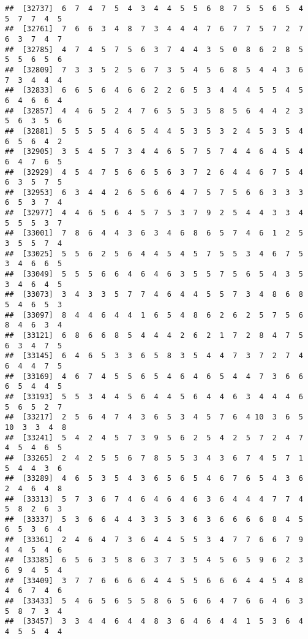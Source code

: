 \documentclass[
]{book}
\begin{document}
\begin{verbatim}
##  [32737]  6  7  4  7  5  4  3  4  4  5  5  6  8  7  5  5  6  5  4  5  7  7  4  5
##  [32761]  7  6  6  3  4  8  7  3  4  4  4  7  6  7  7  5  7  2  7  6  3  7  4  7
##  [32785]  4  7  4  5  7  5  6  3  7  4  4  3  5  0  8  6  2  8  5  5  5  6  5  6
##  [32809]  7  3  3  5  2  5  6  7  3  5  4  5  6  8  5  4  4  3  6  7  3  4  4  4
##  [32833]  6  6  5  6  4  6  6  2  2  6  5  3  4  4  4  5  5  4  5  6  4  6  6  4
##  [32857]  4  4  6  5  2  4  7  6  5  5  3  5  8  5  6  4  4  2  3  5  6  3  5  6
##  [32881]  5  5  5  5  4  6  5  4  4  5  3  5  3  2  4  5  3  5  4  6  5  6  4  2
##  [32905]  3  5  4  5  7  3  4  4  6  5  7  5  7  4  4  6  4  5  4  6  4  7  6  5
##  [32929]  4  5  4  7  5  6  6  5  6  3  7  2  6  4  4  6  7  5  4  6  3  5  7  5
##  [32953]  6  3  4  4  2  6  5  6  6  4  7  5  7  5  6  6  3  3  3  6  5  3  7  4
##  [32977]  4  4  6  5  6  4  5  7  5  3  7  9  2  5  4  4  3  3  4  5  5  5  3  7
##  [33001]  7  8  6  4  4  3  6  3  4  6  8  6  5  7  4  6  1  2  5  3  5  5  7  4
##  [33025]  5  5  6  2  5  6  4  4  5  4  5  7  5  5  3  4  6  7  5  3  4  6  6  5
##  [33049]  5  5  5  6  6  4  6  4  6  3  5  5  7  5  6  5  4  3  5  3  4  6  4  5
##  [33073]  3  4  3  3  5  7  7  4  6  4  4  5  5  7  3  4  8  6  8  5  4  6  5  3
##  [33097]  8  4  4  6  4  4  1  6  5  4  8  6  2  6  2  5  7  5  6  8  4  6  3  4
##  [33121]  6  8  6  6  8  5  4  4  4  2  6  2  1  7  2  8  4  7  5  6  3  4  7  5
##  [33145]  6  4  6  5  3  3  6  5  8  3  5  4  4  7  3  7  2  7  4  6  4  4  7  5
##  [33169]  4  6  7  4  5  5  6  5  4  6  4  6  5  4  4  7  3  6  6  6  5  4  4  5
##  [33193]  5  5  3  4  4  5  6  4  4  5  6  4  4  6  3  4  4  4  6  5  6  5  2  7
##  [33217]  2  5  6  4  7  4  3  6  5  3  4  5  7  6  4 10  3  6  5 10  3  3  4  8
##  [33241]  5  4  2  4  5  7  3  9  5  6  2  5  4  2  5  7  2  4  7  4  5  4  6  5
##  [33265]  2  4  2  5  5  6  7  8  5  5  3  4  3  6  7  4  5  7  1  5  4  4  3  6
##  [33289]  4  6  5  3  5  4  3  6  5  6  5  4  6  7  6  5  4  3  6  2  4  6  4  8
##  [33313]  5  7  3  6  7  4  6  4  6  4  6  3  6  4  4  4  7  7  4  5  8  2  6  3
##  [33337]  5  3  6  6  4  4  3  3  5  3  6  3  6  6  6  6  8  4  5  6  5  3  6  4
##  [33361]  2  4  6  4  7  3  6  4  4  5  5  3  4  7  7  6  6  7  9  4  4  5  4  6
##  [33385]  6  5  6  3  5  8  6  3  7  3  5  4  5  6  5  9  6  2  3  6  9  4  5  4
##  [33409]  3  7  7  6  6  6  6  4  4  5  5  6  6  6  4  4  5  4  8  4  6  7  4  6
##  [33433]  5  4  6  5  6  5  5  8  6  5  6  6  4  7  6  6  4  6  3  5  8  7  3  4
##  [33457]  3  3  4  4  6  4  4  8  3  6  4  6  4  4  1  5  3  6  4  4  5  5  4  4

\end{verbatim}
\end{document}
